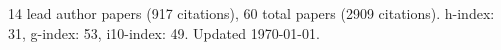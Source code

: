 14 lead author papers (917 citations),
60 total papers (2909 citations).\newline
h-index: 31, g-index: 53, i10-index: 49. Updated \today.